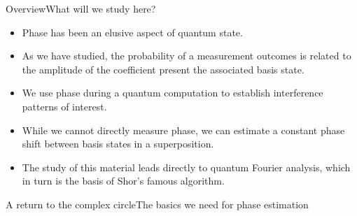 
\begin{frame}{Overview}{What will we study here?}

\begin{itemize}
    \item Phase has been an elusive aspect of quantum state.
    \item As we have studied, the probability of a measurement outcomes is related to the amplitude of the coefficient present the associated basis state.
    \item We use phase during a quantum computation to establish interference patterns of interest.
    \item While we cannot directly measure phase, we can estimate a constant phase shift between basis states in a superposition.
    \item The study of this material leads directly to quantum Fourier analysis, which in turn is the basis of Shor's famous algorithm.
\end{itemize}
    
\end{frame}

\begin{frame}{A return to the complex circle}{The basics we need for phase estimation}
    
\end{frame}

